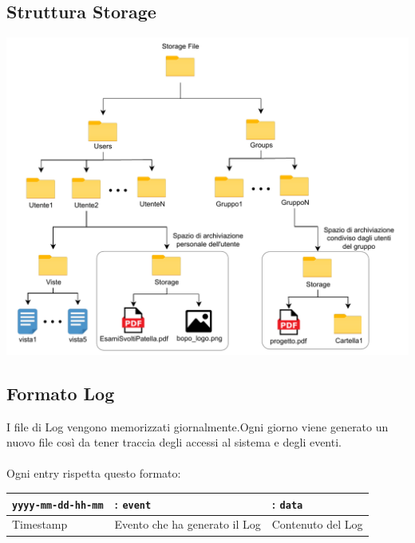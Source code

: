 \subsection*{Struttura Storage}
{}
\vspace{0.5cm}
\begin{adjustwidth}{-1cm}{0cm}
\includegraphics[scale=1]{progettazione/Diagramma-Sequenza-File.drawio.pdf}
\end{adjustwidth}
\vspace{0.5cm}

{}
\vspace{0.5cm}


\subsection*{Formato Log}
I file di Log vengono memorizzati giornalmente.Ogni giorno viene generato un nuovo file così da tener traccia degli accessi al sistema e degli eventi.\\
\\
Ogni entry rispetta questo formato:\\

    \begin{tabular}{|p{3cm} p{3cm} p{3cm}|}
    \hline
    \verb |yyyy-mm-dd-hh-mm| & : \verb|event| & : \verb|data|\\
    \hline
    Timestamp   & Evento che ha generato il Log & Contenuto del Log \\
    \hline
    \end{tabular}
    
